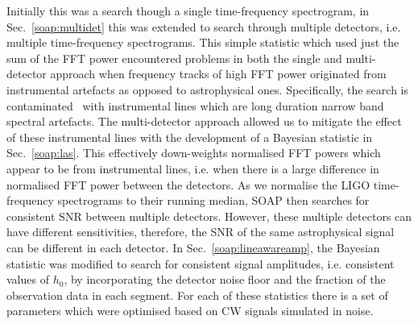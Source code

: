 Initially this was a search though a single time-frequency spectrogram, in
Sec.~\ref{soap:multidet} this was extended to search through multiple
detectors, i.e. multiple time-frequency spectrograms.  This simple statistic
which used just the sum of the \gls{FFT} power encountered problems in both the
single and multi-detector approach when frequency tracks of high \gls{FFT}
power originated from instrumental artefacts as opposed to astrophysical ones.
Specifically, the search is contaminated~ with instrumental lines which are long duration narrow band spectral
artefacts.  The multi-detector approach allowed us to mitigate the effect of
these instrumental lines with the development of a Bayesian statistic in
Sec.~\ref{soap:las}.  This effectively down-weights normalised \gls{FFT} powers
which appear to be from instrumental lines, i.e. when there is a large
difference in normalised \gls{FFT} power between the detectors.  As we
normalise the \gls{LIGO} time-frequency spectrograms to their running median,
SOAP then searches for consistent \gls{SNR} between multiple detectors.
However, these multiple detectors can have different sensitivities, therefore,
the \gls{SNR} of the same astrophysical signal can be different in each
detector.  In Sec.~\ref{soap:lineawareamp}, the Bayesian statistic was modified
to search for consistent signal amplitudes, i.e. consistent values of $h_0$, by
incorporating the detector noise floor and the fraction of the observation data
in each segment.  For each of these statistics there is a set of ~ parameters which were optimised based on \gls{CW} signals simulated
in noise. 

